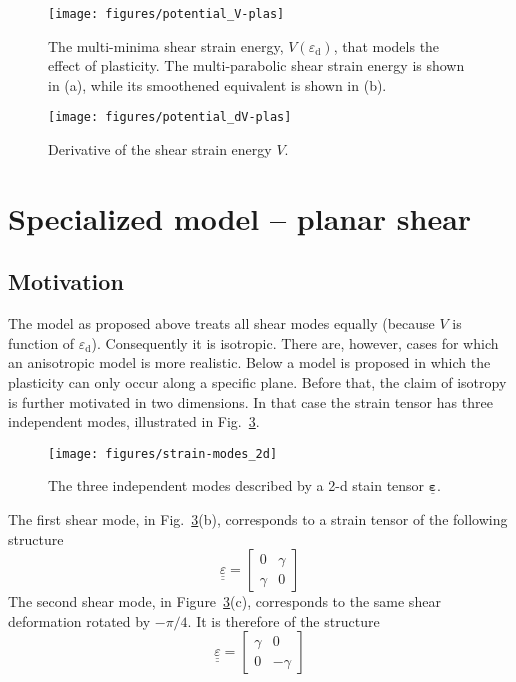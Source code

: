 \documentclass[times,namecite]{goose-article}
\newcommand\T[1]{\underline{\bm{{#1}}}}
\begin{document}
\begin{figure}[htp]
    \centering
    \texttt{[image: figures/potential\_V-plas]}
    \caption{The multi-minima shear strain energy, $V ( \varepsilon_\mathrm{d} )$, that models the effect of plasticity. The multi-parabolic shear strain energy is shown in (a), while its smoothened equivalent is shown in (b).}
    \label{fig:V:plas}
\end{figure}

\begin{figure}[htp]
    \centering
    \texttt{[image: figures/potential\_dV-plas]}
    \caption{Derivative of the shear strain energy $V$.}
    \label{fig:dV:plas}
\end{figure}

\section{Specialized model -- planar shear}

\subsection{Motivation}

The model as proposed above treats all shear modes equally (because $V$ is function of $\varepsilon_\mathrm{d}$). Consequently it is isotropic. There are, however, cases for which an anisotropic model is more realistic. Below a model is proposed in which the plasticity can only occur along a specific plane. Before that, the claim of isotropy is further motivated in two dimensions. In that case the strain tensor has three independent modes, illustrated in Fig.~\ref{fig:strain-modes:2d}.

\begin{figure}[htp]
    \centering
    \texttt{[image: figures/strain-modes\_2d]}
    \caption{The three independent modes described by a 2-d stain tensor $\T{\varepsilon}$.}
    \label{fig:strain-modes:2d}
\end{figure}

The first shear mode, in Fig.~\ref{fig:strain-modes:2d}(b), corresponds to a strain tensor of the following structure
\begin{equation}
    \label{eq:strain-modes:basic}
    \underline{\underline{\varepsilon}}
    =
    \begin{bmatrix}
        0 & \gamma \\
        \gamma & 0
    \end{bmatrix}
\end{equation}
The second shear mode, in Figure~\ref{fig:strain-modes:2d}(c), corresponds to the same shear deformation rotated by $-\pi/4$. It is therefore of the structure
\begin{equation}
    \underline{\underline{\varepsilon}}
    =
    \begin{bmatrix}
        \gamma & 0 \\
         0 & -\gamma
    \end{bmatrix}
\end{equation}
\end{document}
